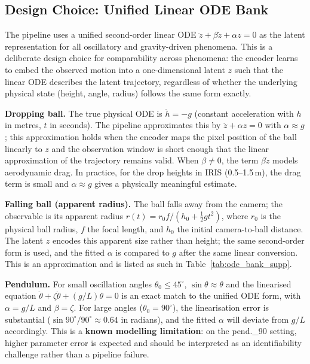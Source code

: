 \documentclass[runningheads]{llncs}
\begin{document}
\subsection{Design Choice: Unified Linear ODE Bank}
\label{app:ode_design}

The pipeline uses a unified second-order linear ODE
$\ddot{z} + \beta\dot{z} + \alpha z = 0$
as the latent representation for all oscillatory and gravity-driven
phenomena. This is a deliberate design choice for comparability across
phenomena: the encoder learns to embed the observed motion into a
one-dimensional latent $z$ such that the linear ODE describes the
latent trajectory, regardless of whether the underlying physical state
(height, angle, radius) follows the same form exactly.

\textbf{Dropping ball.} The true physical ODE is $\ddot{h} = -g$ (constant
acceleration with $h$ in metres, $t$ in seconds). The pipeline approximates
this by $\ddot{z} + \alpha z = 0$ with $\alpha \approx g$; this approximation
holds when the encoder maps the pixel position of the ball linearly to $z$
and the observation window is short enough that the linear approximation of
the trajectory remains valid. When $\beta \neq 0$, the term $\beta\dot{z}$
models aerodynamic drag.  In practice, for the drop heights in IRIS
(0.5--1.5\,m), the drag term is small and $\alpha \approx g$ gives a
physically meaningful estimate.

\textbf{Falling ball (apparent radius).} The ball falls away from the camera;
the observable is its apparent radius $r(t) = r_0 f/(h_0 + \tfrac{1}{2}g t^2)$,
where $r_0$ is the physical ball radius, $f$ the focal length, and $h_0$ the
initial camera-to-ball distance. The latent $z$ encodes this apparent size
rather than height; the same second-order form is used, and the fitted $\alpha$
is compared to $g$ after the same linear conversion. This is an approximation
and is listed as such in Table~\ref{tab:ode_bank_supp}.

\textbf{Pendulum.} For small oscillation angles $\theta_0 \leq 45^\circ$,
$\sin\theta \approx \theta$ and the linearised equation
$\ddot{\theta} + \zeta\dot{\theta} + (g/L)\theta = 0$ is an exact match
to the unified ODE form, with $\alpha = g/L$ and $\beta = \zeta$.
For large angles ($\theta_0 = 90^\circ$), the linearisation error is
substantial ($\sin 90^\circ / 90^\circ \approx 0.64$ in radians), and
the fitted $\alpha$ will deviate from $g/L$ accordingly. This is a
\textbf{known modelling limitation}: on the pend.\_90 setting, higher
parameter error is expected and should be interpreted as an identifiability
challenge rather than a pipeline failure.
\end{document}
